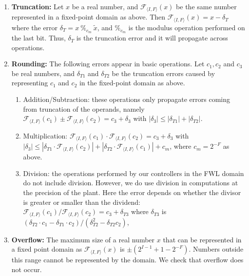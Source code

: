 \documentclass[twocolumn]{autart}    %
\begin{document}
\begin{enumerate}

\item {\bf Truncation:} Let $x$ be a real number, and $\mathcal{F}_{\langle
I,F \rangle}(x)$ be the same number represented in a fixed-point domain as
above.  Then $\mathcal{F}_{\langle I,F \rangle}(x) = x-\delta_T$ where the
error $ \delta_T=x\ \%_{c_m}\ \tilde x$, and $\%_{c_m}$ is the modulus
operation performed on the last bit. 
Thus, $\delta_T$ is the truncation error and it will propagate across
operations.
%
\item {\bf Rounding:} The following errors appear in basic operations.  Let
$c_1, c_2$ and $c_3$ be real numbers, and $\delta_{T1}$ and $\delta_{T2}$ be
the truncation errors caused by representing $c_1$ and $c_2$ in the
fixed-point domain as above.
%
\begin{enumerate}
%
\item Addition/Subtraction: these operations only propagate errors coming
from truncation of the operands, namely $\mathcal{F}_{\langle I,F
\rangle}(c_1) \pm \mathcal{F}_{\langle I,F \rangle}(c_2) = c_3 + \delta_3$
with $|\delta_3| \leq |\delta_{T1}| + |\delta_{T2}|$.
%
\item Multiplication: $\mathcal{F}_{\langle I,F \rangle}(c_1) \cdot
\mathcal{F}_{\langle I,F \rangle}(c_2) =  c_3 + \delta_3$ with $|\delta_3|
\leq |\delta_{T1}\cdot\mathcal{F}_{\langle I,F \rangle}(c_2)|\allowbreak +
|\delta_{T2}\cdot\mathcal{F}_{\langle I,F \rangle}(c_1)| + c_m$, where
$c_m=2^{-F}$ as above.
%
\item Division: the operations performed by our controllers in the FWL
domain do not include division.  However, we do use division in computations
at the precision of the plant.  Here the error depends on whether the
divisor is greater or smaller than the dividend:  $\mathcal{F}_{\langle I,F
\rangle}(c_1) / \mathcal{F}_{\langle I,F \rangle}(c_2) = c_3 + \delta_{T3}$
where $\delta_{T3}$ is $(\delta_{T2}\cdot c_1 - \delta_{T1}\cdot
c_2)/(\delta_{T2}^2 - \delta_{T2} c_2)$,
%
\end{enumerate}

\item {\bf Overflow:}
The maximum size of a real number $x$ that can be represented in a fixed
point domain as $\mathcal{F}_{\langle I,F \rangle}(x)$ is $\pm
(2^{I-1}+1-2^{-F})$.  Numbers outside this range cannot be represented by
the domain.  We check that overflow does not occur.

\end{enumerate}
\end{document}
